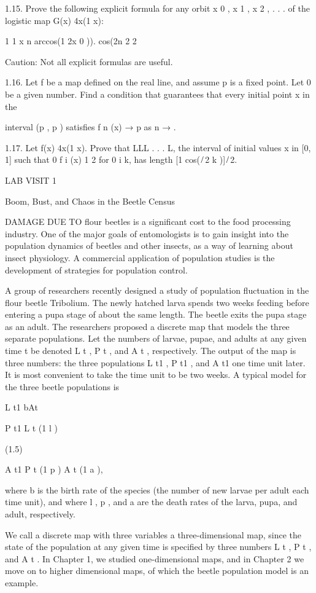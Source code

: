 \documentclass[12pt]{article}
\begin{document}
{1.15. Prove the following explicit formula for any orbit x 0 , x 1 , x 2 , . . .  of the logistic map G(x)  
4x(1  x):

1 1 x n  arccos(1  2x 0 )).  cos(2n  2 2

Caution: Not all explicit formulas are useful.

1.16. Let f be a map deﬁned on the real line, and assume p is a ﬁxed point. Let   0 be a given number. 
Find a condition that guarantees that every initial point x in the

interval (p  , p   ) satisﬁes f n (x) → p as n → .

1.17. Let f(x)  4x(1  x). Prove that LLL . . . L, the interval of initial values x in [0, 1] such that 0  f 
i (x)  1  2 for 0 i  k, has length [1  cos(  ̸ 2 k )] ̸ 2.

LAB VISIT 1

Boom, Bust, and Chaos in the Beetle Census

DAMAGE DUE TO ﬂour beetles is a signiﬁcant cost to the food processing industry. One of the major goals 
of entomologists is to gain insight into the population dynamics of beetles and other insects, as a way of 
learning about insect physiology. A commercial application of population studies is the development of 
strategies for population control.

A group of researchers recently designed a study of population ﬂuctuation in the ﬂour beetle Tribolium. 
The newly hatched larva spends two weeks feeding before entering a pupa stage of about the same length. The 
beetle exits the pupa stage as an adult. The researchers proposed a discrete map that models the three 
separate populations. Let the numbers of larvae, pupae, and adults at any given time t be denoted L t , P t 
, and A t , respectively. The output of the map is three numbers: the three populations L t1 , P t1 , and A 
t1 one time unit later. It is most convenient to take the time unit to be two weeks. A typical model for 
the three beetle populations is

L t1  bAt 

P t1  L t (1   l )

(1.5)

A t1  P t (1   p )  A t (1   a ),

where b is the birth rate of the species (the number of new larvae per adult each time unit), and where  l 
,  p , and  a are the death rates of the larva, pupa, and adult, respectively.

We call a discrete map with three variables a three-dimensional map, since the state of the population at 
any given time is speciﬁed by three numbers L t , P t , and A t . In Chapter 1, we studied one-dimensional 
maps, and in Chapter 2 we move on to higher dimensional maps, of which the beetle population model is an 
example.

}
\end{document}
